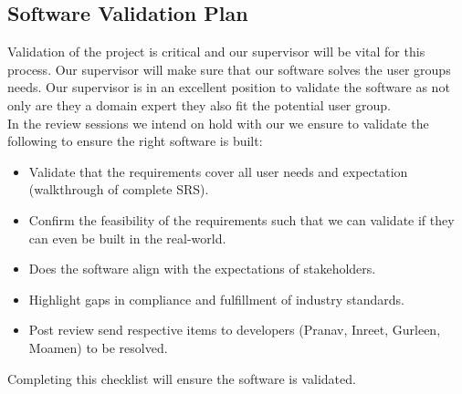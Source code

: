 \documentclass[12pt, titlepage]{article}
\begin{document}
\subsection{Software Validation Plan} \label{section:3.7}


Validation of the project is critical and our supervisor will be vital for this process. Our supervisor will make sure that our software solves the user groups needs. Our supervisor is in an excellent position to validate the software as not only are they a domain expert they also fit the potential user group.\\

In the review sessions we intend on hold with our we ensure to validate the following to ensure the right software is built:

\begin{itemize}
  \item Validate that the requirements cover all user needs and expectation (walkthrough of complete SRS).
  \item Confirm the feasibility of the requirements such that we can validate if they can even be built in the real-world.
  \item Does the software align with the expectations of stakeholders.
  \item Highlight gaps in compliance and fulfillment of industry standards.
  \item Post review send respective items to developers (Pranav, Inreet, Gurleen, Moamen) to be resolved.
\end{itemize}

Completing this checklist will ensure the software is validated.
\end{document}
